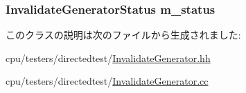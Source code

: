 \label{classInvalidateGenerator_aae7af981b728cf3cdda1dd5cf218711a}
\hypertarget{classInvalidateGenerator_a81c972f519d92e29514aaf7c760f38c5}{
\subsubsection[{m\_\-status}]{\setlength{\rightskip}{0pt plus 5cm}InvalidateGeneratorStatus {\bf m\_\-status}}}
\label{classInvalidateGenerator_a81c972f519d92e29514aaf7c760f38c5}


このクラスの説明は次のファイルから生成されました:\begin{DoxyCompactItemize}
\item 
cpu/testers/directedtest/\hyperlink{InvalidateGenerator_8hh}{InvalidateGenerator.hh}\item 
cpu/testers/directedtest/\hyperlink{InvalidateGenerator_8cc}{InvalidateGenerator.cc}\end{DoxyCompactItemize}
